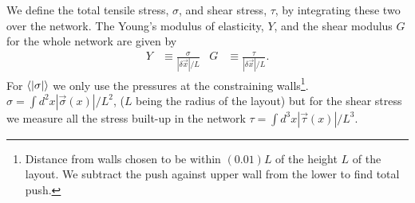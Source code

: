 \documentclass[nofootinbib,preprint,endfloats]{revtex4} %
\begin{document}
We define the total tensile stress, $\sigma$, and shear stress, $\tau$, by integrating these two over the network. %
The Young's modulus of elasticity, $Y$, and the shear modulus $G$ for the whole network  are given by 
\begin{align}
    Y &\equiv \frac{\sigma}{ |\delta \vec{x}|/L} &
    G &\equiv \frac{\tau}{ |\delta \vec{x}|/L} 
    \label{eq:YG}.
\end{align}
For $\be{|\sigma|}$ we only use the pressures at the constraining walls\footnote{Distance from walls chosen to be within $(0.01) L$ of the height $L$ of the layout. 
We subtract the push against upper wall from the lower to find total push. }.  
$\sigma = \int d^2x |\vec{\sigma}(x)|/L^2 $, ($L$ being the radius of the layout) but for the shear stress we measure all the stress built-up in the network $\tau = \int d^3 x |\vec{\tau}(x)| /L^3$. 
\end{document}
